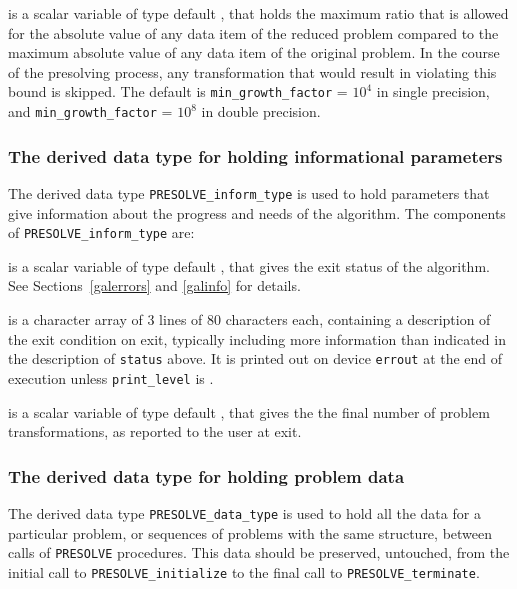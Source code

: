 \documentclass{galahad}
\newcommand{\packagename}{PRESOLVE}
\newcommand{\sym}{\tt\small}
\begin{document}
\begin{description}
 is a scalar variable of type default
\realdp, that holds the maximum ratio that is allowed for the absolute
value of any data item of the reduced problem compared to the maximum
absolute value of any data item of the original problem.  In the
course of the presolving process, any transformation that would result in
violating this bound is skipped.
The default is {\tt min\_growth\_factor} = $10^{4}$ in single
precision, and {\tt min\_growth\_factor} = $10^{8}$ in double
precision. 

\end{description}


\subsubsection{The derived data type for holding informational
 parameters}\label{typeinform}
The derived data type 
{\tt \packagename\_inform\_type} 
is used to hold parameters that give information about the progress and needs 
of the algorithm. The components of 
{\tt \packagename\_inform\_type} 
are:

\begin{description}

 is a scalar variable of type default \integer, that gives the
exit status of the algorithm. See Sections~\ref{galerrors} and \ref{galinfo}
for details.

 is a character array of 3 lines of 80 characters each, 
containing a description of the exit condition
on exit, typically including more information
than indicated in the description of {\tt status} above.
It is printed out on device {\tt errout} at the end of execution
unless {\tt print\_level} is {\sym \galsymsilent}.

 is a scalar variable of type default \integer, that
gives the the final number of problem transformations, as reported
to the user at exit.
\end{description}


\subsubsection{The derived data type for holding problem data}\label{typedata}
The derived data type 
{\tt \packagename\_data\_type} 
is used to hold all the data for a particular problem,
or sequences of problems with the same structure, between calls of 
{\tt \packagename} procedures. 
This data should be preserved, untouched, from the initial call to 
{\tt \packagename\_initialize}
to the final call to
{\tt \packagename\_terminate}.
\end{document}
